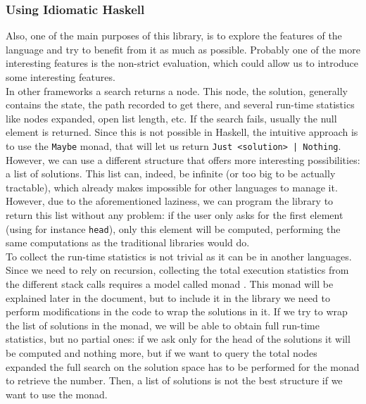 \subsubsection{Using Idiomatic Haskell}

Also, one of the main purposes of this library, is to explore the features of
the language and try to benefit from it as much as possible. Probably one of
the more interesting features is the non-strict evaluation, which could allow
us to introduce some interesting features.\\

In other frameworks \cite{cpp-search, cs4j, java-aima, hog2} a search returns a
node. This node, the solution, generally contains the state, the path recorded
to get there, and several run-time statistics like nodes expanded, open list
length, etc. If the search fails, usually the null element is returned. Since
this is not possible in Haskell, the intuitive approach is to use the
\texttt{Maybe} monad, that will let us return \texttt{Just <solution> |
  Nothing}. However, we can use a different structure that offers more
interesting possibilities: a list of solutions. This list can, indeed, be
infinite (or too big to be actually tractable), which already makes impossible
for other languages to manage it. However, due to the aforementioned laziness,
we can program the library to return this list without any problem: if the user
only asks for the first element (using for instance \texttt{head}), only this
element will be computed, performing the same computations as the traditional
libraries would do.\\

To collect the run-time statistics is not trivial as it can be in another
languages. Since we need to rely on recursion, collecting the total execution
statistics from the different stack calls requires a model called monad
\cite{wadler-1993-monad}. This monad will be explained later in the document,
but to include it in the library we need to perform modifications in the code
to wrap the solutions in it. If we try to wrap the list of solutions in the
monad, we will be able to obtain full run-time statistics, but no partial ones:
if we ask only for the head of the solutions it will be computed and nothing
more, but if we want to query the total nodes expanded the full search on the
solution space has to be performed for the monad to retrieve the number. Then,
a list of solutions is not the best structure if we want to use the monad.\\

